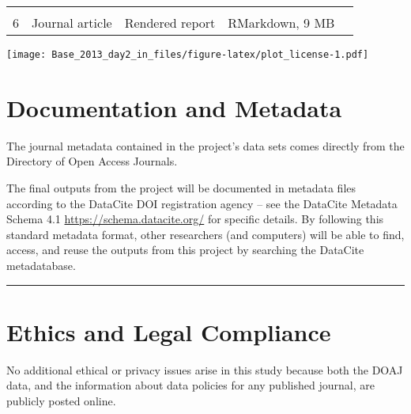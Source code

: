 \documentclass[]{article}
\begin{document}
\begin{longtable}[]{@{}cllll@{}}
\begin{minipage}[t]{0.18\columnwidth}
\strut
\end{minipage}\tabularnewline
\begin{minipage}[t]{0.11\columnwidth}\centering\strut
6\strut
\end{minipage} & \begin{minipage}[t]{0.11\columnwidth}\raggedright\strut
Journal article\strut
\end{minipage} & \begin{minipage}[t]{0.16\columnwidth}\raggedright\strut
Rendered report\strut
\end{minipage} & \begin{minipage}[t]{0.14\columnwidth}\raggedright\strut
RMarkdown, 9 MB\strut
\end{minipage} & \begin{minipage}[t]{0.18\columnwidth}\raggedright\strut
\strut
\end{minipage}\tabularnewline
\bottomrule
\end{longtable}

\texttt{[image: Base\_2013\_day2\_in\_files/figure-latex/plot\_license-1.pdf]}

\section{Documentation and Metadata}\label{documentation-and-metadata}

The journal metadata contained in the project's data sets comes directly
from the Directory of Open Access Journals.

The final outputs from the project will be documented in metadata files
according to the DataCite DOI registration agency -- see the DataCite
Metadata Schema 4.1 \url{https://schema.datacite.org/} for specific
details. By following this standard metadata format, other researchers
(and computers) will be able to find, access, and reuse the outputs from
this project by searching the DataCite metadatabase.

\begin{center}\rule{0.5\linewidth}{\linethickness}\end{center}

\section{Ethics and Legal Compliance}\label{ethics-and-legal-compliance}

No additional ethical or privacy issues arise in this study because both
the DOAJ data, and the information about data policies for any published
journal, are publicly posted online.
\end{document}
